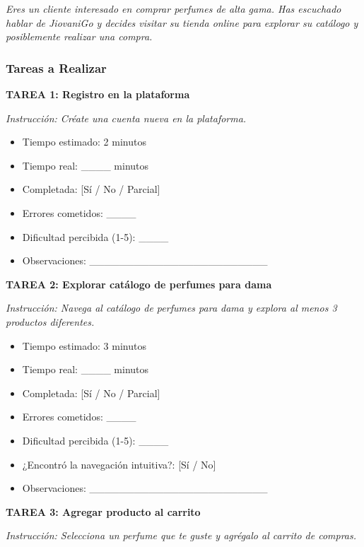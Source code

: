 \documentclass[12pt,a4paper]{article}
\begin{document}
\textit{Eres un cliente interesado en comprar perfumes de alta gama. Has escuchado hablar de JiovaniGo y decides visitar su tienda online para explorar su catálogo y posiblemente realizar una compra.}

\subsubsection{Tareas a Realizar}

\textbf{TAREA 1: Registro en la plataforma}

\textit{Instrucción: Créate una cuenta nueva en la plataforma.}

\begin{itemize}
    \item Tiempo estimado: 2 minutos
    \item Tiempo real: \_\_\_\_ minutos
    \item Completada: [Sí / No / Parcial]
    \item Errores cometidos: \_\_\_\_
    \item Dificultad percibida (1-5): \_\_\_\_
    \item Observaciones: \_\_\_\_\_\_\_\_\_\_\_\_\_\_\_\_\_\_\_\_\_\_\_\_
\end{itemize}

\textbf{TAREA 2: Explorar catálogo de perfumes para dama}

\textit{Instrucción: Navega al catálogo de perfumes para dama y explora al menos 3 productos diferentes.}

\begin{itemize}
    \item Tiempo estimado: 3 minutos
    \item Tiempo real: \_\_\_\_ minutos
    \item Completada: [Sí / No / Parcial]
    \item Errores cometidos: \_\_\_\_
    \item Dificultad percibida (1-5): \_\_\_\_
    \item ¿Encontró la navegación intuitiva?: [Sí / No]
    \item Observaciones: \_\_\_\_\_\_\_\_\_\_\_\_\_\_\_\_\_\_\_\_\_\_\_\_
\end{itemize}

\textbf{TAREA 3: Agregar producto al carrito}

\textit{Instrucción: Selecciona un perfume que te guste y agrégalo al carrito de compras.}
\end{document}
